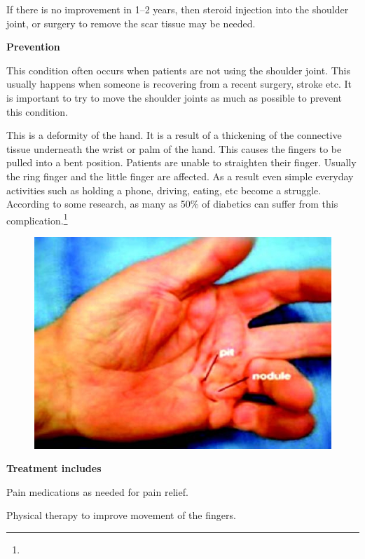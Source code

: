 { \item If there is no improvement in 1–2 years, then steroid injection into the shoulder joint, or surgery to remove the scar tissue may be needed.

\textbf{Prevention}

This condition often occurs when patients are not using the shoulder joint. This usually happens when someone is recovering from a recent surgery, stroke etc. It is important to try to move the shoulder joints as much as possible to prevent this condition.


This is a deformity of the hand. It is a result of a thickening of the connective tissue underneath the wrist or palm of the hand. This causes the fingers to be pulled into a bent position. Patients are unable to straighten their finger. Usually the ring finger and the little finger are affected. As a result even simple everyday activities such as holding a phone, driving, eating, etc become a struggle. According to some research, as many as 50\% of diabetics can suffer from this complication.\footnote{}

\begin{figure}
\includegraphics{images/074.jpg}
\end{figure}

\textbf{Treatment includes}

\item Pain medications as needed for pain relief.

 \item Physical therapy to improve movement of the fingers.

}
